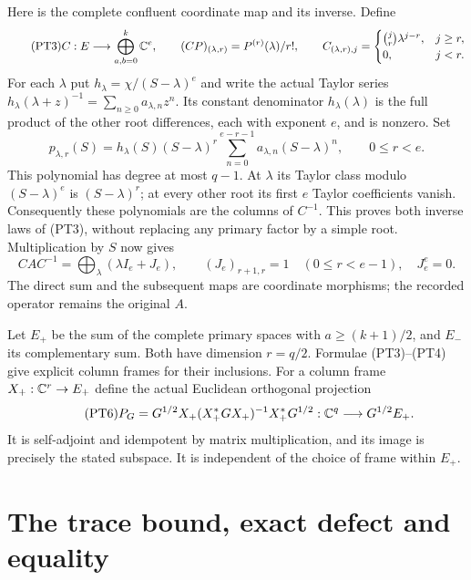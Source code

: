 Here is the complete confluent coordinate map and its inverse. Define
\begin{equation}\tag{PT3}
 C:E\longrightarrow\bigoplus_{a,b=0}^k\mathbb C^e,\qquad
 (CP)_{(\lambda,r)}=P^{(r)}(\lambda)/r!,\qquad
 C_{(\lambda,r),j}=\begin{cases}\binom jr\lambda^{j-r},&j\ge r,\\0,&j<r.
 \end{cases}
\end{equation}
For each \(\lambda\) put \(h_\lambda=\chi/(S-\lambda)^e\) and
write the actual Taylor series
\(h_\lambda(\lambda+z)^{-1}=\sum_{n\ge0}a_{\lambda,n}z^n\).
Its constant denominator \(h_\lambda(\lambda)\) is the full product
of the other root differences, each with exponent \(e\), and is
nonzero. Set
\begin{equation}\tag{PT4}
 p_{\lambda,r}(S)=h_\lambda(S)(S-\lambda)^r
       \sum_{n=0}^{e-r-1}a_{\lambda,n}(S-\lambda)^n,
 \qquad0\le r<e.
\end{equation}
This polynomial has degree at most \(q-1\). At \(\lambda\) its
Taylor class modulo \((S-\lambda)^e\) is \((S-\lambda)^r\);
at every other root its first \(e\) Taylor coefficients vanish.
Consequently these polynomials are the columns of \(C^{-1}\).
This proves both inverse laws of (PT3), without replacing any primary
factor by a simple root. Multiplication by \(S\) now gives
\begin{equation}\tag{PT5}
 CAC^{-1}=\bigoplus_\lambda(\lambda I_e+J_e),\qquad
 (J_e)_{r+1,r}=1\quad(0\le r<e-1),\quad J_e^e=0.
\end{equation}
The direct sum and the subsequent maps are coordinate morphisms;
the recorded operator remains the original \(A\).

Let \(E_+\) be the sum of the complete primary spaces with
\(a\ge(k+1)/2\), and \(E_-\) its complementary sum. Both have
dimension \(r=q/2\). Formulae (PT3)--(PT4) give explicit column
frames for their inclusions. For a column frame \(X_+:\mathbb C^r\to E_+\)
define the actual Euclidean orthogonal projection
\begin{equation}\tag{PT6}
 P_G=G^{1/2}X_+(X_+^*GX_+)^{-1}X_+^*G^{1/2}
       :\mathbb C^q\longrightarrow G^{1/2}E_+.
\end{equation}
It is self-adjoint and idempotent by matrix multiplication, and its
image is precisely the stated subspace. It is independent of the
choice of frame within \(E_+\).

\section{The trace bound, exact defect and equality}

